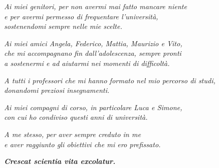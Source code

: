 \begin{flushright}
\textit{
Ai miei genitori, per non avermi mai fatto mancare niente \\ 
e per avermi permesso di frequentare l'università, \\
sostenendomi sempre nelle mie scelte.
}
\bigskip

\textit{
Ai miei amici Angela, Federico, Mattia, Maurizio e Vito, \\
che mi accompagnano fin dall'adolescenza,  sempre pronti \\
a sostenermi e ad aiutarmi nei momenti di difficoltà.
}
\bigskip

\textit{
A tutti i professori che mi hanno formato nel mio percorso di studi, \\
donandomi preziosi insegnamenti.
}
\bigskip

\textit{
Ai miei compagni di corso, in particolare Luca e Simone, \\
con cui ho condiviso questi anni di università.
}
\bigskip

\textit{
A me stesso, per aver sempre creduto in me \\
e aver raggiunto gli obiettivi che mi ero prefissato.
}
\medskip

\textit{
\textbf{Crescat scientia vita excolatur.}}

\end{flushright}